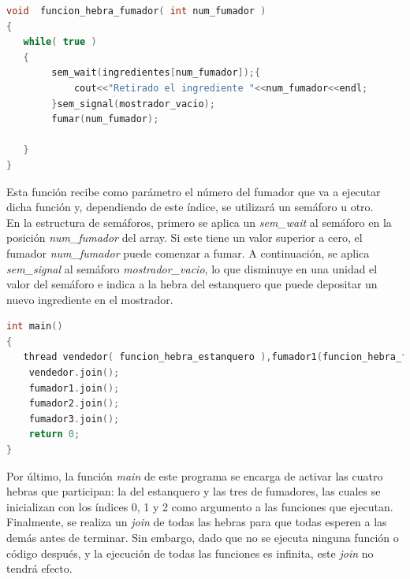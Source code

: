 \documentclass{article}
\begin{document}
\begin{lstlisting}[language=C++,caption=función hebra fumador ] 
void  funcion_hebra_fumador( int num_fumador )
{
   while( true )
   {
		sem_wait(ingredientes[num_fumador]);{
			cout<<"Retirado el ingrediente "<<num_fumador<<endl;
		}sem_signal(mostrador_vacio);
		fumar(num_fumador);

   }
}
\end{lstlisting}
Esta función recibe como parámetro el número del fumador que va a ejecutar dicha función y, dependiendo de este índice, se utilizará un semáforo u otro. \\
En la estructura de semáforos, primero se aplica un \textit{sem\_wait} al semáforo en la posición \textit{num\_fumador} del array. Si este tiene un valor superior a cero, el fumador \textit{num\_fumador} puede comenzar a fumar. A continuación, se aplica \textit{sem\_signal} al semáforo \textit{mostrador\_vacio}, lo que disminuye en una unidad el valor del semáforo e indica a la hebra del estanquero que puede depositar un nuevo ingrediente en el mostrador.

\begin{lstlisting}[language=C++,caption=función main] 
int main()
{
   thread vendedor( funcion_hebra_estanquero ),fumador1(funcion_hebra_fumador,0),fumador2(funcion_hebra_fumador,1),fumador3(funcion_hebra_fumador,2);
	vendedor.join();
	fumador1.join();
	fumador2.join();
	fumador3.join();
    return 0;
}
\end{lstlisting}
Por último, la función \textit{main} de este programa se encarga de activar las cuatro hebras que participan: la del estanquero y las tres de fumadores, las cuales se inicializan con los índices 0, 1 y 2 como argumento a las funciones que ejecutan. Finalmente, se realiza un \textit{join} de todas las hebras para que todas esperen a las demás antes de terminar. Sin embargo, dado que no se ejecuta ninguna función o código después, y la ejecución de todas las funciones es infinita, este \textit{join} no tendrá efecto.
\end{document}
